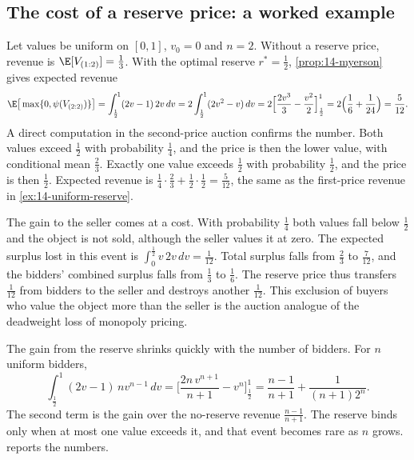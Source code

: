 \subsection{The cost of a reserve price: a worked example}\label{sec:14-optimal-example}

Let values be uniform on $[0,1]$, $v_0=0$ and $n=2$. Without a reserve price, revenue is $\E[V_{(1:2)}]=\frac13$. With the optimal reserve $r^*=\frac12$, \cref{prop:14-myerson} gives expected revenue
\[
\E\big[\max\{0,\psi(V_{(2:2)})\}\big]=\int_{\frac{1}{2}}^{1}(2v-1)\,2v\,dv=2\int_{\frac{1}{2}}^{1}(2v^2-v)\,dv=2\Big[\frac{2v^3}{3}-\frac{v^2}{2}\Big]_{\frac{1}{2}}^{1}=2\Big(\frac16+\frac{1}{24}\Big)=\frac{5}{12}.
\]
A direct computation in the second-price auction confirms the number. Both values exceed $\frac12$ with probability $\frac14$, and the price is then the lower value, with conditional mean $\frac23$. Exactly one value exceeds $\frac12$ with probability $\frac12$, and the price is then $\frac12$. Expected revenue is $\frac14\cdot\frac23+\frac12\cdot\frac12=\frac{5}{12}$, the same as the first-price revenue in \cref{ex:14-uniform-reserve}.

The gain to the seller comes at a cost. With probability $\frac14$ both values fall below $\frac12$ and the object is not sold, although the seller values it at zero. The expected surplus lost in this event is $\int_0^{\frac{1}{2}}v\,2v\,dv=\frac{1}{12}$. Total surplus falls from $\frac23$ to $\frac{7}{12}$, and the bidders' combined surplus falls from $\frac13$ to $\frac16$. The reserve price thus transfers $\frac{1}{12}$ from bidders to the seller and destroys another $\frac{1}{12}$. This exclusion of buyers who value the object more than the seller is the auction analogue of the deadweight loss of monopoly pricing.

The gain from the reserve shrinks quickly with the number of bidders. For $n$ uniform bidders,
\[
\int_{\frac{1}{2}}^{1}(2v-1)\,nv^{n-1}\,dv=\Big[\frac{2n\,v^{n+1}}{n+1}-v^n\Big]_{\frac{1}{2}}^{1}=\frac{n-1}{n+1}+\frac{1}{(n+1)2^n}.
\]
The second term is the gain over the no-reserve revenue $\frac{n-1}{n+1}$. The reserve binds only when at most one value exceeds it, and that event becomes rare as $n$ grows.  reports the numbers.

